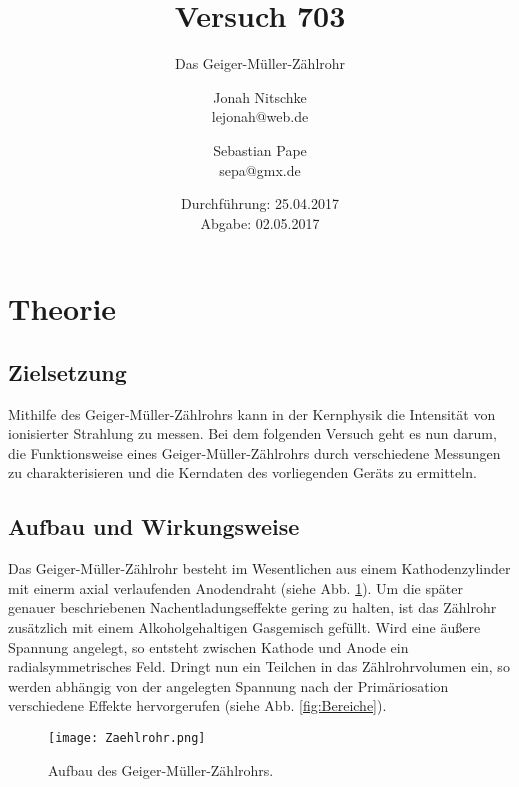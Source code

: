 

\title{Versuch 703}
\subtitle{Das Geiger-Müller-Zählrohr}
\author{Jonah Nitschke\\
        lejonah@web.de \and
        Sebastian Pape\\
        sepa@gmx.de}
\date{Durchführung: 25.04.2017\\
      Abgabe: 02.05.2017}




\maketitle

\section{Theorie}

\subsection{Zielsetzung}

Mithilfe des Geiger-Müller-Zählrohrs kann in der Kernphysik die Intensität von
ionisierter Strahlung zu messen. Bei dem folgenden Versuch geht es nun darum,
die Funktionsweise eines Geiger-Müller-Zählrohrs durch verschiedene Messungen
zu charakterisieren und die Kerndaten des vorliegenden Geräts zu ermitteln.

\subsection{Aufbau und Wirkungsweise}

Das Geiger-Müller-Zählrohr besteht im Wesentlichen aus einem Kathodenzylinder
mit einerm axial verlaufenden Anodendraht (siehe Abb. \ref{fig:Geiger}). Um die
später genauer beschriebenen Nachentladungseffekte gering zu halten, ist das
Zählrohr zusätzlich mit einem Alkoholgehaltigen Gasgemisch gefüllt. Wird eine
äußere Spannung angelegt, so entsteht zwischen Kathode und Anode ein
radialsymmetrisches Feld. Dringt nun ein Teilchen in das Zählrohrvolumen ein,
so werden abhängig von der angelegten Spannung nach der Primäriosation
verschiedene Effekte hervorgerufen (siehe Abb. \ref{fig:Bereiche}).

\begin{figure}
  \centering
  \texttt{[image: Zaehlrohr.png]}
  \caption{Aufbau des Geiger-Müller-Zählrohrs.}
  \label{fig:Geiger}
\end{figure}

